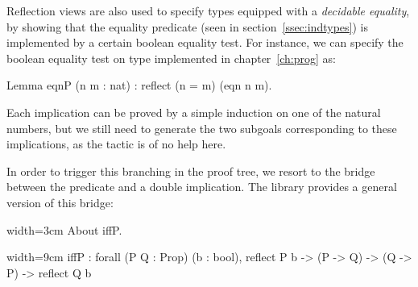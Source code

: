 Reflection views are also used to specify types equipped with a
\emph{decidable equality}, by showing that the equality predicate
 (seen in section~\ref{ssec:indtypes}) is implemented by a
certain boolean equality test. For instance, we can specify the
boolean equality test on type  implemented in
chapter~\ref{ch:prog} as:

\begin{coq}{}{}
Lemma eqnP (n m : nat) : reflect (n = m) (eqn n m).
\end{coq}

Each implication can be proved by a simple induction on one of the
natural numbers, but we still need to generate the two subgoals
corresponding to these implications, as the  tactic is of no
help here.



In order to trigger this branching in the proof tree, we resort to the
bridge between the  predicate and a double implication.
The  library provides a general version of
this bridge:

\begin{coq-left}{}{width=3cm}
About iffP.
$~$
$~$
\end{coq-left}
\begin{coqout-right}{}{width=9cm}
iffP : forall (P Q : Prop) (b : bool),
  reflect P b -> (P -> Q) -> (Q -> P) ->
    reflect Q b
\end{coqout-right}

